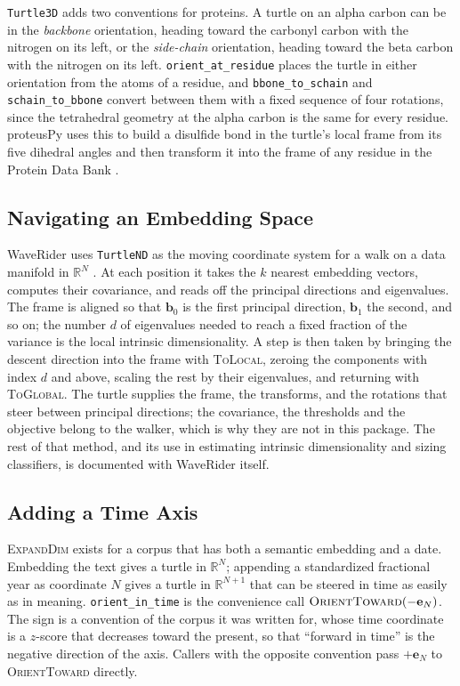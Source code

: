 \documentclass[11pt,letterpaper]{article}
\newcommand{\R}{\mathbb{R}}
\newcommand{\basis}{\mathbf{b}}
\newcommand{\std}{\mathbf{e}}
\newcommand{\code}[1]{\texttt{#1}}
\newcommand{\op}[1]{\textup{\textsc{#1}}}
\begin{document}
\code{Turtle3D} adds two conventions for proteins. A turtle on an alpha
carbon can be in the \emph{backbone} orientation, heading toward the
carbonyl carbon with the nitrogen on its left, or the \emph{side-chain}
orientation, heading toward the beta carbon with the nitrogen on its
left. \code{orient\_at\_residue} places the turtle in either
orientation from the atoms of a residue, and \code{bbone\_to\_schain}
and \code{schain\_to\_bbone} convert between them with a fixed sequence
of four rotations, since the tetrahedral geometry at the alpha carbon is
the same for every residue. proteusPy uses this to build a disulfide
bond in the turtle's local frame from its five dihedral angles and then
transform it into the frame of any residue in the Protein Data Bank
\citep{suchanek2024proteuspy, suchanek2026disulfide}.

\subsection{Navigating an Embedding Space}
\label{sec:navigation}

WaveRider uses \code{TurtleND} as the moving coordinate system for a
walk on a data manifold in $\R^N$ \citep{suchanek2026waverider}. At
each position it takes the $k$ nearest embedding vectors, computes
their covariance, and reads off the principal directions and
eigenvalues. The frame is aligned so that $\basis_0$ is the first
principal direction, $\basis_1$ the second, and so on; the number $d$
of eigenvalues needed to reach a fixed fraction of the variance is the
local intrinsic dimensionality. A step is then taken by bringing the
descent direction into the frame with \op{ToLocal}, zeroing the
components with index $d$ and above, scaling the rest by their
eigenvalues, and returning with \op{ToGlobal}. The turtle supplies
the frame, the transforms, and the rotations that steer between
principal directions; the covariance, the thresholds and the objective
belong to the walker, which is why they are not in this package. The
rest of that method, and its use in estimating intrinsic dimensionality
and sizing classifiers, is documented with WaveRider itself.

\subsection{Adding a Time Axis}
\label{sec:time}

\op{ExpandDim} exists for a corpus that has both a semantic
embedding and a date. Embedding the text gives a turtle in $\R^N$;
appending a standardized fractional year as coordinate $N$ gives a
turtle in $\R^{N+1}$ that can be steered in time as easily as in
meaning. \code{orient\_in\_time} is the convenience call
$\op{OrientToward}(-\std_N)$. The sign is a convention of the
corpus it was written for, whose time coordinate is a $z$-score that
decreases toward the present, so that ``forward in time'' is the
negative direction of the axis. Callers with the opposite convention
pass $+\std_N$ to \op{OrientToward} directly.
\end{document}
